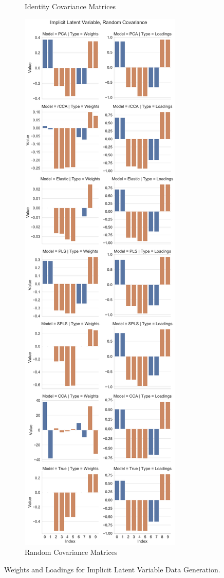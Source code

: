 \begin{figure}
\begin{subfigure}{0.49\linewidth}
\caption{Identity Covariance Matrices}
\end{subfigure}
%
\begin{subfigure}{0.49\linewidth}
\centering
\includegraphics[width=\linewidth]{figures/simulated/repeated/Combined_Weights_Loadings_with_Error_Bars_Random_Covariance_implicit}
\caption{Random Covariance Matrices}
\end{subfigure}
\caption{Weights and Loadings for Implicit Latent Variable Data Generation.}
\end{figure}

